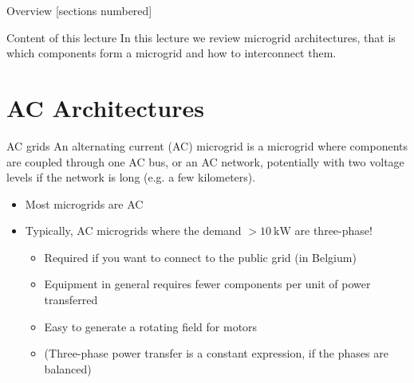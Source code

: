 \titleframe

\begin{frame}{Overview}
  [sections numbered]
  \tableofcontents
\end{frame}


\begin{frame}{Content of this lecture}
In this lecture we review microgrid architectures, that is which components form a microgrid and how to interconnect them.

\end{frame}

\section{AC Architectures}

\begin{frame}{AC grids}
An alternating current (AC) microgrid is a microgrid where components are coupled through one AC bus, or an AC network, potentially with two voltage levels if the network is long (e.g. a few kilometers).
\begin{itemize}
  \item Most microgrids are AC
  \item Typically, AC microgrids where the demand $>10 \mathrm{~kW}$ are three-phase!
  \begin{itemize}
    \item Required if you want to connect to the public grid (in Belgium)
    \item Equipment in general requires fewer components per unit of power transferred
    \item Easy to generate a rotating field for motors
    \item (Three-phase power transfer is a constant expression, if the phases are balanced)
  \end{itemize}
\end{itemize}

\end{frame}

